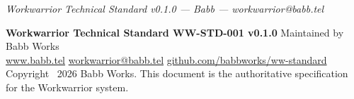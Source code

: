 \documentclass[11pt, a4paper, DIV=14]{scrartcl}
\let\origRule\rule
\renewcommand{\rule}[2]{\par\vspace{2pt}\noindent{\color{BabbBorder}\origRule[0pt]{#1}{#2}}\par\vspace{2pt}}
\begin{document}
\begin{center}\rule{0.5\linewidth}{0.5pt}\end{center}

\emph{Workwarrior Technical Standard v0.1.0 --- Babb ---
workwarrior@babb.tel}

\vspace{12pt}
\noindent{\color{BabbBorder}\origRule[0pt]{\linewidth}{0.5pt}}
\vspace{4pt}

{\footnotesize\sffamily\color{BabbGray}
\textbf{Workwarrior Technical Standard WW-STD-001 v0.1.0}
\enspace\textbar\enspace Maintained by Babb Works\\
\href{https://www.babb.tel}{www.babb.tel}
\enspace\textbar\enspace
\href{mailto:workwarrior@babb.tel}{workwarrior@babb.tel}
\enspace\textbar\enspace
\href{https://github.com/babbworks/ww-standard}{github.com/babbworks/ww-standard}\\[2pt]
Copyright \textcopyright~2026 Babb Works.
This document is the authoritative specification for the Workwarrior system.
}
\end{document}
